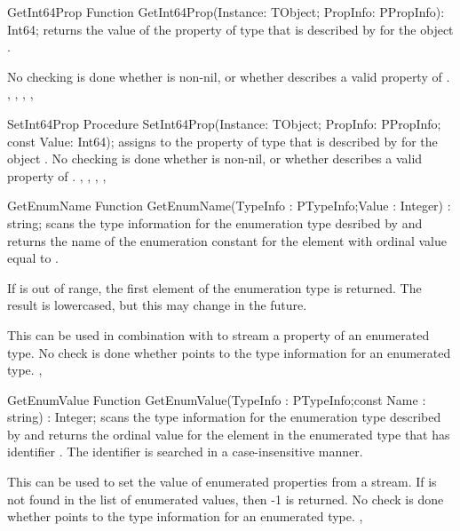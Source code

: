 \begin{function}{GetInt64Prop}
\Declaration
Function GetInt64Prop(Instance: TObject; PropInfo: PPropInfo): Int64;
\Description
{} returns the value of the property of type
 that is described by  for the object
.

\Errors
No checking is done whether  is non-nil, or whether
 describes a valid  property of .
\SeeAlso
{}, , ,
, 

\end{function}

\begin{procedure}{SetInt64Prop}
\Declaration
Procedure SetInt64Prop(Instance: TObject; PropInfo: PPropInfo; const Value: Int64);
\Description
{} assigns  to the property of type
 that is described by  for the object
.
\Errors
No checking is done whether  is non-nil, or whether
 describes a valid  property of .
\SeeAlso
{}, , , ,
\end{procedure}

\begin{function}{GetEnumName}
\Declaration
Function GetEnumName(TypeInfo : PTypeInfo;Value : Integer) : string;
\Description
{} scans the type information for the enumeration type
desribed by  and returns the name of the enumeration 
constant for the element with ordinal value equal to .

If  is out of range, the first element of the enumeration type
is returned. The result is lowercased, but this may change in the future.

This can be used in combination with  to stream a property
of an enumerated type.
\Errors
No check is done whether  points to the type information
for an enumerated type. 
\SeeAlso
{}, 
\end{function}

\begin{function}{GetEnumValue}
\Declaration
Function GetEnumValue(TypeInfo : PTypeInfo;const Name : string) : Integer;
\Description
{} scans the type information for the enumeration type
described by  and returns the ordinal value for the element
in the enumerated type that has identifier . The identifier is
searched in a case-insensitive manner.

This can be used to set the value of enumerated properties from a stream. 
\Errors
If  is not found in the list of enumerated values, then -1 is
returned. No check is done whether  points to the type information
for an enumerated type. 
\SeeAlso
{}, 
\end{function}
